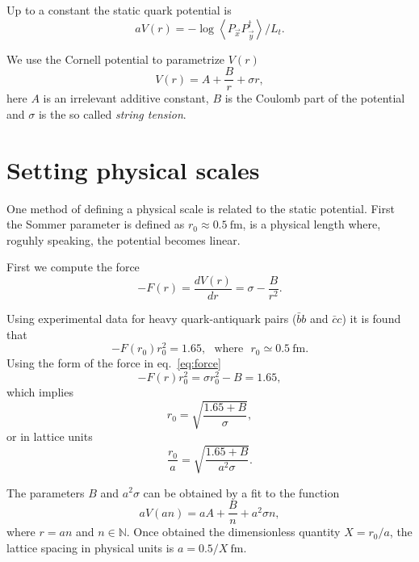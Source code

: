 \documentclass[12pt,a4paper]{article}
\begin{document}
 Up to a constant the static quark potential is
\begin{equation}
	aV(r) = - \log \left\langle P_{\vec{x}} P_{\vec{y}}^{\dagger} \right\rangle/L_t.
\end{equation}

We use the Cornell potential to parametrize $V(r)$
\begin{equation}
	V(r) = A + \frac{B}{r} + \sigma r,
\end{equation}
here $A$ is an irrelevant additive constant, $B$ is the Coulomb part of the potential and $\sigma$ is the so called \textit{string tension}.

\section{Setting physical scales}
One method of defining a physical scale is related to the static potential. First the Sommer parameter is defined as $r_0 \approx 0.5 \ \text{fm}$, is a physical length where, roguhly speaking, the potential becomes linear.

First we compute the force 
\begin{equation}
	\label{eq:force}
	-F(r) = \frac{dV(r)}{dr} = \sigma - \frac{B}{r^2}.
\end{equation}

Using experimental data for heavy quark-antiquark pairs ($\bar{b}b$ and $\bar{c}c$) it is found that 
\begin{equation}
	-F(r_0)r_0^2 = 1.65, \ \ \ \text{where} \ \ \ r_0 \simeq 0.5 \ \text{fm}.
\end{equation}
Using the form of the force in eq.\ \eqref{eq:force} 
	\begin{equation}
		-F(r)r_0^2 = \sigma r_0^2 - B = 1.65,
	\end{equation}
which implies
	\begin{equation}
		r_0 = \sqrt{\frac{1.65+B}{\sigma}},
	\end{equation}
or in lattice units
	\begin{equation}
		\frac{r_0}{a} = \sqrt{\frac{1.65+B}{a^2\sigma}}.
	\end{equation}

The parameters $B$ and $a^2\sigma$ can be obtained by a fit to the function
\begin{equation}
	aV(an) = aA+\frac{B}{n} + a^2\sigma n,
\end{equation}	
	where $r = a n$ and $n\in \mathbb{N}$.
	Once obtained the dimensionless quantity $X = r_0/a$, the lattice spacing in physical units is $a = 0.5/X \ \text{fm}$.
	
\end{document}

